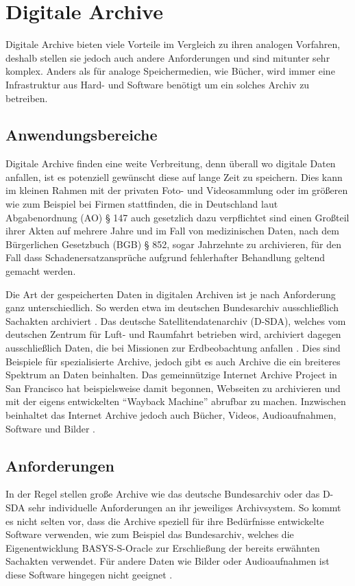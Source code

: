 \documentclass[conference,compsoc,final,a4paper]{IEEEtran}
\begin{document}
\section{Digitale Archive}
Digitale Archive bieten viele Vorteile im Vergleich zu ihren analogen Vorfahren, deshalb stellen sie jedoch auch andere Anforderungen und sind mitunter sehr komplex. Anders als für analoge Speichermedien, wie Bücher, wird immer eine Infrastruktur aus Hard- und Software benötigt um ein solches Archiv zu betreiben.

\subsection{Anwendungsbereiche}
Digitale Archive finden eine weite Verbreitung, denn überall wo digitale Daten anfallen, ist es potenziell gewünscht diese auf lange Zeit zu speichern. Dies kann im kleinen Rahmen mit der privaten Foto- und Videosammlung oder im größeren wie zum Beispiel bei Firmen stattfinden, die in Deutschland laut Abgabenordnung (AO) § 147 auch gesetzlich dazu verpflichtet sind einen Großteil ihrer Akten auf mehrere Jahre und im Fall von medizinischen Daten, nach dem Bürgerlichen Gesetzbuch (BGB) § 852, sogar Jahrzehnte zu archivieren, für den Fall dass Schadenersatzansprüche aufgrund fehlerhafter Behandlung geltend gemacht werden.

Die Art der gespeicherten Daten in digitalen Archiven ist je nach Anforderung ganz unterschiedlich. So werden etwa im deutschen Bundesarchiv ausschließlich Sachakten archiviert \autocite{Berger2005}. Das deutsche Satellitendatenarchiv (\acs{D-SDA}), welches vom deutschen Zentrum für Luft- und Raumfahrt betrieben wird, archiviert dagegen ausschließlich Daten, die bei Missionen zur Erdbeobachtung anfallen \autocite{Memishi2019}. Dies sind Beispiele für spezialisierte Archive, jedoch gibt es auch Archive die ein breiteres Spektrum an Daten beinhalten. Das gemeinnützige Internet Archive Project in San Francisco hat beispielsweise damit begonnen, Webseiten zu archivieren und mit der eigens entwickelten \enquote{Wayback Machine} abrufbar zu machen. Inzwischen beinhaltet das Internet Archive jedoch auch Bücher, Videos, Audioaufnahmen, Software und Bilder \autocite{AboutIA}.

\subsection{Anforderungen}
In der Regel stellen große Archive wie das deutsche Bundesarchiv oder das \acs{D-SDA} sehr individuelle Anforderungen an ihr jeweiliges Archivsystem. So kommt es nicht selten vor, dass die Archive speziell für ihre Bedürfnisse entwickelte Software verwenden, wie zum Beispiel das Bundesarchiv, welches die Eigenentwicklung BASYS-S-Oracle zur Erschließung der bereits erwähnten Sachakten verwendet. Für andere Daten wie Bilder oder Audioaufnahmen ist diese Software hingegen nicht geeignet \autocite{Berger2005}.
\end{document}
